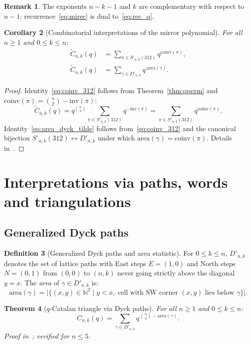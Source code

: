 \documentclass[12pt,a4paper,reqno]{amsart}
\theoremstyle{plain}
\newtheorem{theorem}{Theorem}[section]
\newtheorem{corollary}[theorem]{Corollary}
\theoremstyle{definition}
\newtheorem{definition}[theorem]{Definition}
\newtheorem{remark}[theorem]{Remark}
\newcommand{\Inv}{\mathrm{inv}}
\newcommand{\Coinv}{\mathrm{coinv}}
\newcommand{\Area}{\mathrm{area}}
\newcommand{\Snkp}[1]{S'_{n,k}(#1)}
\newcommand{\Dnk}{D'_{n,k}}
\newcommand{\Ctilde}{\widetilde{C}}
\newcommand{\NN}{\mathbb{N}}
\begin{document}
\begin{remark}\label{rem:miroir_dual}
The exponents $n-k-1$ and $k$ are complementary with respect to $n-1$:
recurrence~\eqref{eq:mirec} is dual to~\eqref{eq:rec_q}.
\end{remark}

\begin{corollary}[Combinatorial interpretations of the mirror polynomial]
\label{cor:miroir}
For all $n\ge1$ and $0\le k\le n$:
\begin{align}
\label{eq:coinv_312}
\Ctilde_{n,k}(q) &= \sum_{\pi\in\Snkp{312}} q^{\Coinv(\pi)},\\[4pt]
\label{eq:area_dyck_tilde}
\Ctilde_{n,k}(q) &= \sum_{\gamma\in\Dnk} q^{\,\Area(\gamma)}.
\end{align}
\end{corollary}
\begin{proof}
Identity~\eqref{eq:coinv_312} follows from Theorem~\ref{thm:qperm}
and $\Coinv(\pi)=\binom{n}{2}-\Inv(\pi)$:
\[\Ctilde_{n,k}(q)
=q^{\binom{n}{2}}\sum_{\pi\in\Snkp{312}}q^{-\Inv(\pi)}
=\sum_{\pi\in\Snkp{312}}q^{\Coinv(\pi)}.\]
Identity~\eqref{eq:area_dyck_tilde} follows from~\eqref{eq:coinv_312}
and the canonical bijection $\Snkp{312}\leftrightarrow\Dnk$
under which $\Area(\gamma)=\Coinv(\pi)$. Details in~\cite{W3,W4}.
\end{proof}

\section{Interpretations via paths, words and triangulations}\label{sec:paths}
\subsection{Generalized Dyck paths}
\begin{definition}[Generalized Dyck paths and area statistic]\label{def:dyck}
For $0\le k\le n$, $\Dnk$ denotes the set of lattice paths with East steps
$E=(1,0)$ and North steps $N=(0,1)$ from $(0,0)$ to $(n,k)$
never going strictly above the diagonal $y=x$.
The \emph{area} of $\gamma\in\Dnk$ is:
\[\Area(\gamma) = \bigl|\bigl\{(x,y)\in\NN^2 \;\big|\; y < x,\;
\text{cell with SW corner }(x,y)\text{ lies below }\gamma\bigr\}\bigr|.\]
\end{definition}

\begin{theorem}[$q$-Catalan triangle via Dyck paths]\label{thm:dyck}
For all $n\ge1$ and $0\le k\le n$:
\begin{equation}\label{eq:dyck_stat}
C_{n,k}(q) = \sum_{\gamma\in\Dnk} q^{\,\binom{n}{2}-\Area(\gamma)}.
\end{equation}
Proof in~\cite{W4}; verified for $n\le 5$.
\end{theorem}
\end{document}
